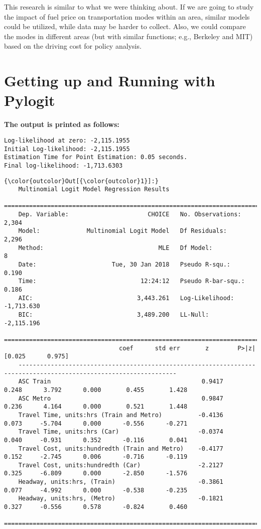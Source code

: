 \documentclass[12pt]{article}
\begin{document}
This research is similar to what we were thinking about. If we are going to study the impact of fuel price on transportation modes within an area, similar models could be utilized, while data may be harder to collect. Also, we could compare the modes in different areas (but with similar functions; e.g., Berkeley and MIT) based on the driving cost for policy analysis. 
\newpage
\section{Getting up and Running with Pylogit}
\textbf{The output is printed as follows:}
\begin{Verbatim}[fontsize=\small, commandchars=\\\{\}]
Log-likelihood at zero: -2,115.1955
Initial Log-likelihood: -2,115.1955
Estimation Time for Point Estimation: 0.05 seconds.
Final log-likelihood: -1,713.6303
\end{Verbatim}
\begin{Verbatim}[fontsize=\scriptsize, commandchars=\\\{\}]
{\color{outcolor}Out[{\color{outcolor}1}]:}
	Multinomial Logit Model Regression Results                    
	===================================================================================
	Dep. Variable:                      CHOICE   No. Observations:                2,304
	Model:             Multinomial Logit Model   Df Residuals:                    2,296
	Method:                                MLE   Df Model:                            8
	Date:                     Tue, 30 Jan 2018   Pseudo R-squ.:                   0.190
	Time:                             12:24:12   Pseudo R-bar-squ.:               0.186
	AIC:                             3,443.261   Log-Likelihood:             -1,713.630
	BIC:                             3,489.200   LL-Null:                    -2,115.196
	==================================================================================================================
							    coef      std err       z        P>|z|      [0.025      0.975]
	------------------------------------------------------------------------------------------------------------------
	ASC Train                                          0.9417      0.248      3.792      0.000       0.455       1.428
	ASC Metro                                          0.9847      0.236      4.164      0.000       0.521       1.448
	Travel Time, units:hrs (Train and Metro)          -0.4136      0.073     -5.704      0.000      -0.556      -0.271
	Travel Time, units:hrs (Car)                      -0.0374      0.040     -0.931      0.352      -0.116       0.041
	Travel Cost, units:hundredth (Train and Metro)    -0.4177      0.152     -2.745      0.006      -0.716      -0.119
	Travel Cost, units:hundredth (Car)                -2.2127      0.325     -6.809      0.000      -2.850      -1.576
	Headway, units:hrs, (Train)                       -0.3861      0.077     -4.992      0.000      -0.538      -0.235
	Headway, units:hrs, (Metro)                       -0.1821      0.327     -0.556      0.578      -0.824       0.460
	==================================================================================================================
\end{Verbatim}
\end{document}
